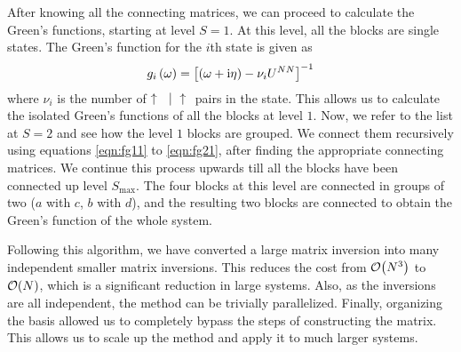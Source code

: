 	After knowing all the connecting matrices, we can proceed to calculate the Green's functions, starting at level $ S=1 $. At this level, all the blocks are single states. The Green's function for the $ i $th state is given as
	\begin{align}\label{eqn:gf-s1}
		g_i\left(\omega\right) = \left[ \left( \omega + \mathrm{i} \eta\right) - \nu_i U^{NN} \right]^{-1}
	\end{align}
	where $ \nu_i $ is the number of $ \uparrow\  \ |\  \uparrow\  $ pairs in the state. This allows us to calculate the isolated Green's functions of all the blocks at level $ 1 $. Now, we refer to the list at $ S = 2 $ and see how the level $ 1 $ blocks are grouped. We connect them recursively using equations \eqref{eqn:fg11} to \eqref{eqn:fg21}, after finding the appropriate connecting matrices. We continue this process upwards till all the blocks have been connected up level $ S_{\mathrm{max}} $. The four blocks at this level are connected in groups of two ($ a $ with $ c $, $ b $ with $ d $), and the resulting two blocks are connected to obtain the Green's function of the whole system.
	
	Following this algorithm, we have converted a large matrix inversion into many independent smaller matrix inversions. This reduces the cost from $ \order{N^3} $ to $ \order{N} $, which is a significant reduction in large systems. Also, as the inversions are all independent, the method can be trivially parallelized. Finally, organizing the basis allowed us to completely bypass the steps of constructing the matrix. This allows us to scale up the method and apply it to much larger systems.